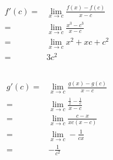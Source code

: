\documentclass{article}
\begin{document}
        \subsection{}
            \paragraph{
                \begin{equation*}
                    \begin{split}
                        f'(c)=&\lim _{x\rightarrow c}\frac{f(x)-f(c)}{x-c}\\
                            =&\lim _{x\rightarrow c} \frac{x^3-c^3}{x-c}\\
                            =&\lim _{x\rightarrow c} x^2+xc+c^2\\
                            =&3c^2
                    \end{split}
                \end{equation*}
            }
        \subsection{}
            \paragraph{
                \begin{equation*}
                    \begin{split}
                        g'(c)=&\lim _{x\rightarrow c} \frac{g(x)-g(c)}{x-c}\\
                            =&\lim_{x\rightarrow c}\frac{\frac{1}{x}-\frac{1}{c}}{x-c}\\
                            =&\lim_{x\rightarrow c}\frac{c-x}{xc(x-c)}\\
                            =&\lim _{x\rightarrow c} -\frac{1}{cx}\\
                            =&-\frac{1}{c^2}
                    \end{split}
                \end{equation*}
            }
        \subsection{}
\end{document}
